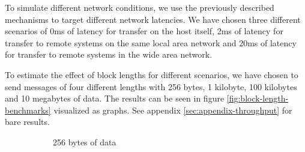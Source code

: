 To simulate different network conditions, we use the previously described mechanisms to target different network latencies.
We have chosen three different scenarios of 0ms of latency for transfer on the host itself, 2ms of latency for transfer to remote systems on the same local area network and 20ms of latency for transfer to remote systems in the wide area network.

To estimate the effect of block lengths for different scenarios, we have chosen to send messages of four different lengths with 256 bytes, 1 kilobyte, 100 kilobytes and 10 megabytes of data.
The results can be seen in figure \ref{fig:block-length-benchmarks} visualized as graphs.
See appendix \ref{sec:appendix-throughput} for bare results.

\begin{figure}
    \centering

    \begin{subfigure}[t]{0.4\textwidth}
        \resizebox*{!}{0.9\textwidth}
        {
        }
        \caption{256 bytes of data}
        \label{fig:block-length-benchmark-256b}
    \end{subfigure}
    \hspace{2em}
    \begin{subfigure}[t]{0.4\textwidth}
        \resizebox*{!}{0.9\textwidth}
        {
            }
\end{subfigure}
\end{figure}
